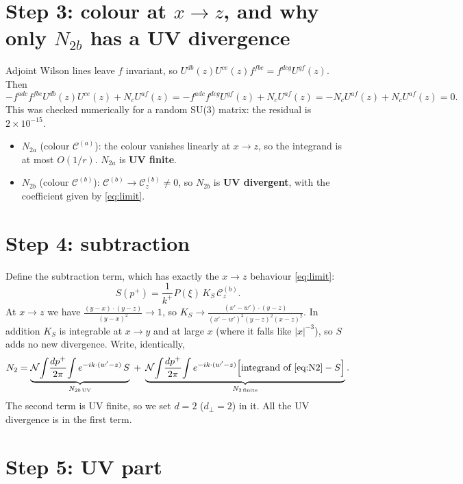 \documentclass[10pt]{article}
\numberwithin{equation}{section}
\newcommand{\Cz}{\mathcal{C}^{(b)}_{z}}
\begin{document}
\section{Step 3: colour at $x\to z$, and why only $N_{2b}$ has a UV divergence}
Adjoint Wilson lines leave $f$ invariant, so $U^{db}(z)U^{ce}(z)f^{fbe}=f^{dcg}U^{gf}(z)$. Then
\begin{equation}
-f^{adc}f^{fbe}U^{db}(z)U^{ce}(z)+N_{c}U^{af}(z)=-f^{adc}f^{dcg}U^{gf}(z)+N_{c}U^{af}(z)=-N_{c}U^{af}(z)+N_{c}U^{af}(z)=0 .
\end{equation}
This was checked numerically for a random SU(3) matrix: the residual is $2\times10^{-15}$.
\begin{itemize}
\item \textbf{$N_{2a}$} (colour $\mathcal{C}^{(a)}$): the colour vanishes linearly at $x\to z$, so the integrand is at most $O(1/r)$. $N_{2a}$ is \textbf{UV finite}.
\item \textbf{$N_{2b}$} (colour $\mathcal{C}^{(b)}$): $\mathcal{C}^{(b)}\to\Cz\neq0$, so $N_{2b}$ is \textbf{UV divergent}, with the coefficient given by \eqref{eq:limit}.
\end{itemize}

\section{Step 4: subtraction}
Define the subtraction term, which has exactly the $x\to z$ behaviour \eqref{eq:limit}:
\begin{equation}
S(p^{+})=\frac{1}{k^{+}}P(\xi)\,K_{S}\,\Cz .
\end{equation}
At $x\to z$ we have $\frac{(y-x)\cdot(y-z)}{(y-x)^{2}}\to1$, so $K_{S}\to\frac{(x'-w')\cdot(y-z)}{(x'-w')^{2}(y-z)^{2}(x-z)^{2}}$. In addition $K_{S}$ is integrable at $x\to y$ and at large $x$ (where it falls like $|x|^{-3}$), so $S$ adds no new divergence. Write, identically,
\begin{equation}
N_{2}=\underbrace{\mathcal{N}\!\int\!\frac{dp^{+}}{2\pi}\!\int e^{-ik\cdot(w'-z)}\,S}_{N_{2b\,\rm UV}}\;+\;\underbrace{\mathcal{N}\!\int\!\frac{dp^{+}}{2\pi}\!\int e^{-ik\cdot(w'-z)}\Big[\text{integrand of }\eqref{eq:N2}-S\Big]}_{N_{2\,\rm finite}}.
\end{equation}
The second term is UV finite, so we set $d=2$ ($d_{\perp}=2$) in it. All the UV divergence is in the first term.

\section{Step 5: UV part}
\end{document}
